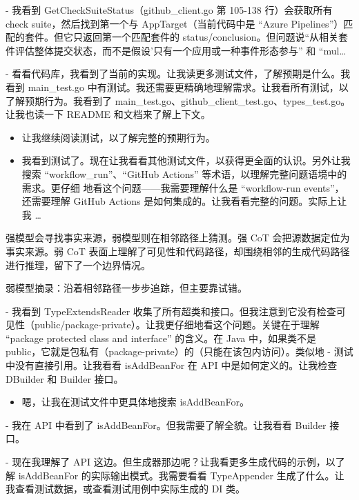 \documentclass[
  10
]{article}
\providecommand{\tightlist}{%
  \setlength{\itemsep}{0pt}\setlength{\parskip}{0pt}}
\begin{document}
- 我看到 GetCheckSuiteStatus（github\_client.go 第 105-138 行）会获取所有 check suite，然后找到第一个与 AppTarget（当前代码中是 ``Azure Pipelines''）匹配的套件。但它只返回第一个匹配套件的 status/conclusion。但问题说``从相关套件评估整体提交状态，而不是假设'只有一个应用或一种事件形态参与'' 和 ``mul\ldots{}

- 看看代码库，我看到了当前的实现。让我读更多测试文件，了解预期是什么。我看到 main\_test.go 中有测试。我还需要更精确地理解需求。让我看所有测试，以了解预期行为。我看到了 main\_test.go、github\_client\_test.go、types\_test.go。让我也读一下 README 和文档来了解上下文。

\begin{itemize}
\item
  让我继续阅读测试，以了解完整的预期行为。
\item
  我看到测试了。现在让我看看其他测试文件，以获得更全面的认识。另外让我搜索
  ``workflow\_run''、``GitHub Actions'' 等术语，以理解完整问题语境中的需求。更仔细
  地看这个问题——我需要理解什么是 ``workflow-run events''，还需要理解 GitHub Actions
  是如何集成的。让我看看完整的问题。实际上让我 \ldots{}
\end{itemize}

强模型会寻找事实来源，弱模型则在相邻路径上猜测。强 CoT 会把源数据定位为事实来源。弱 CoT 表面上理解了可见性和代码路径，却围绕相邻的生成代码路径进行推理，留下了一个边界情况。

弱模型摘录：沿着相邻路径一步步追踪，但主要靠试错。

- 我看到 TypeExtendsReader 收集了所有超类和接口。但我注意到它没有检查可见性（public/package-private）。让我更仔细地看这个问题。关键在于理解 ``package protected class and interface'' 的含义。在 Java 中，如果类不是 public，它就是包私有（package-private）的（只能在该包内访问）。类似地 - 测试中没有直接引用。让我看看 isAddBeanFor 在 API 中是如何定义的。让我检查 DBuilder 和 Builder 接口。

\begin{itemize}
\tightlist
\item
  嗯，让我在测试文件中更具体地搜索 isAddBeanFor。
\end{itemize}



- 我在 API 中看到了 isAddBeanFor。但我需要了解全貌。让我看看 Builder 接口。

- 现在我理解了 API 这边。但生成器那边呢？让我看更多生成代码的示例，以了解 isAddBeanFor 的实际输出模式。我需要看看 TypeAppender 生成了什么。让我查看测试数据，或查看测试用例中实际生成的 DI 类。
\end{document}
